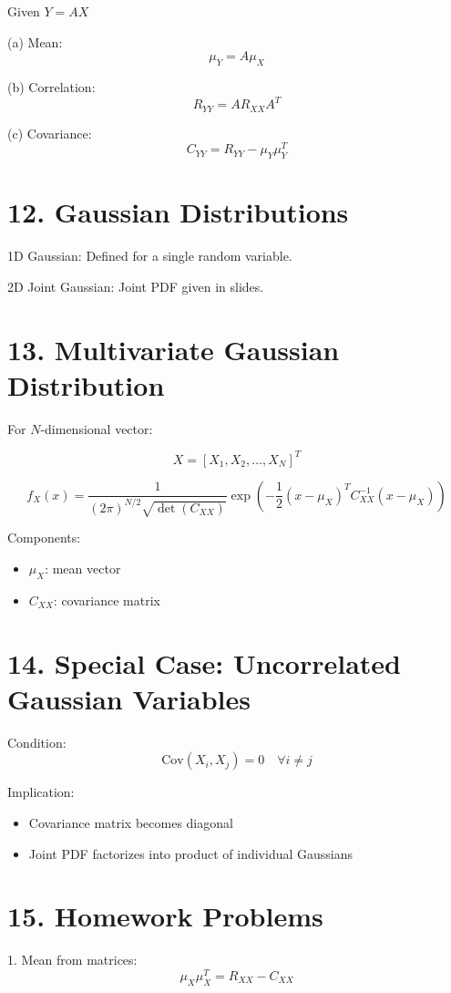 \documentclass[12pt]{article}
\begin{document}
Given $Y = AX$

(a) Mean:
\[
\mu_Y = A\mu_X
\]

(b) Correlation:
\[
R_{YY} = AR_{XX}A^T
\]

(c) Covariance:
\[
C_{YY} = R_{YY} - \mu_Y \mu_Y^T
\]

\section*{12. Gaussian Distributions}

1D Gaussian: Defined for a single random variable.

2D Joint Gaussian: Joint PDF given in slides.

\section*{13. Multivariate Gaussian Distribution}

For $N$-dimensional vector:

\[
X = [X_1, X_2, \dots, X_N]^T
\]

\[
f_X(x) = \frac{1}{(2\pi)^{N/2} \sqrt{\det(C_{XX})}} 
\exp\left(-\frac{1}{2}(x - \mu_X)^T C_{XX}^{-1} (x - \mu_X)\right)
\]

Components:
\begin{itemize}
\item $\mu_X$: mean vector
\item $C_{XX}$: covariance matrix
\end{itemize}

\section*{14. Special Case: Uncorrelated Gaussian Variables}

Condition:
\[
\text{Cov}(X_i, X_j) = 0 \quad \forall i \neq j
\]

Implication:
\begin{itemize}
\item Covariance matrix becomes diagonal
\item Joint PDF factorizes into product of individual Gaussians
\end{itemize}

\section*{15. Homework Problems}

1. Mean from matrices:
\[
\mu_X \mu_X^T = R_{XX} - C_{XX}
\]
\end{document}
